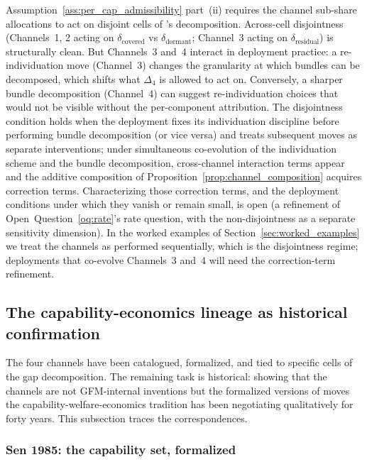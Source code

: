 \begin{remark}
\label{rem:ch34_interaction}
Assumption~\ref{ass:per_cap_admissibility} part~(ii) requires the
channel sub-share allocations to act on disjoint cells of
\citep[Definition~8]{lasser2026paper8b}'s decomposition.
Across-cell disjointness (Channels~1, 2 acting on
$\delta_{\mathrm{covered}}$ vs $\delta_{\mathrm{dormant}}$;
Channel~3 acting on $\delta_{\mathrm{residual}}$) is structurally
clean.  But Channels~3 and~4 interact in deployment practice: a
re-individuation move (Channel~3) changes the granularity at
which bundles can be decomposed, which shifts what
$\Delta_4$ is allowed to act on.  Conversely, a sharper bundle
decomposition (Channel~4) can suggest re-individuation choices
that would not be visible without the per-component attribution.
The disjointness condition holds when the deployment fixes its
individuation discipline before performing bundle decomposition
(or vice versa) and treats subsequent moves as separate
interventions; under simultaneous co-evolution of the
individuation scheme and the bundle decomposition,
cross-channel interaction terms appear and the additive
composition of Proposition~\ref{prop:channel_composition} acquires
correction terms.  Characterizing those correction terms, and
the deployment conditions under which they vanish or remain
small, is open (a refinement of
Open~Question~\ref{oq:rate}'s rate question, with the
non-disjointness as a separate sensitivity dimension).  In the
worked examples of Section~\ref{sec:worked_examples} we treat
the channels as performed sequentially, which is the
disjointness regime; deployments that co-evolve Channels~3
and~4 will need the correction-term refinement.
\end{remark}

\subsection{The capability-economics lineage as historical confirmation}
\label{sec:lineage_historical}

The four channels have been catalogued, formalized, and tied to
specific cells of the gap decomposition.  The remaining task is
historical: showing that the channels are not GFM-internal
inventions but the formalized versions of moves the
capability-welfare-economics tradition has been negotiating
qualitatively for forty years.  This subsection traces the
correspondences.

\subsubsection{Sen 1985: the capability set, formalized}

